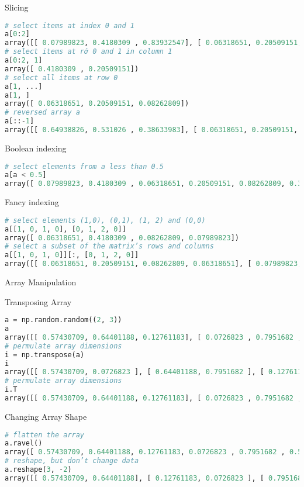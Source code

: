 Slicing

\begin{lstlisting}[language=Python]
# select items at index 0 and 1
a[0:2]
array([[ 0.07989823, 0.4180309 , 0.83932547], [ 0.06318651, 0.20509151, 0.08262809]])
# select items at rớ 0 and 1 in column 1
a[0:2, 1]
array([ 0.4180309 , 0.20509151])
# select all items at row 0
a[1, ...]
a[1, ]
array([ 0.06318651, 0.20509151, 0.08262809])
# reversed array a
a[::-1]
array([[ 0.64938826, 0.531026 , 0.38633983], [ 0.06318651, 0.20509151, 0.08262809], [ 0.07989823, 0.4180309 , 0.83932547]])
\end{lstlisting}

Boolean indexing

\begin{lstlisting}[language=Python]
# select elements from a less than 0.5
a[a < 0.5]
array([ 0.07989823, 0.4180309 , 0.06318651, 0.20509151, 0.08262809, 0.38633983])
\end{lstlisting}

Fancy indexing

\begin{lstlisting}[language=Python]
# select elements (1,0), (0,1), (1, 2) and (0,0)
a[[1, 0, 1, 0], [0, 1, 2, 0]]
array([ 0.06318651, 0.4180309 , 0.08262809, 0.07989823])
# select a subset of the matrix’s rows and columns
a[[1, 0, 1, 0]][:, [0, 1, 2, 0]]
array([[ 0.06318651, 0.20509151, 0.08262809, 0.06318651], [ 0.07989823, 0.4180309 , 0.83932547, 0.07989823], [ 0.06318651, 0.20509151, 0.08262809, 0.06318651], [ 0.07989823, 0.4180309 , 0.83932547, 0.07989823]])
\end{lstlisting}

Array Manipulation

Transposing Array

\begin{lstlisting}[language=Python]
a = np.random.random((2, 3))
a
array([[ 0.57430709, 0.64401188, 0.12761183], [ 0.0726823 , 0.7951682 , 0.54114093]])
# permulate array dimensions
i = np.transpose(a)
i
array([[ 0.57430709, 0.0726823 ], [ 0.64401188, 0.7951682 ], [ 0.12761183, 0.54114093]])
# permulate array dimensions
i.T
array([[ 0.57430709, 0.64401188, 0.12761183], [ 0.0726823 , 0.7951682 , 0.54114093]])
\end{lstlisting}

Changing Array Shape

\begin{lstlisting}[language=Python]
# flatten the array
a.ravel()
array([ 0.57430709, 0.64401188, 0.12761183, 0.0726823 , 0.7951682 , 0.54114093])
# reshape, but don’t change data
a.reshape(3, -2)
array([[ 0.57430709, 0.64401188], [ 0.12761183, 0.0726823 ], [ 0.7951682 , 0.54114093]])
\end{lstlisting}

